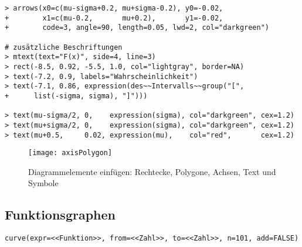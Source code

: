 \begin{lstlisting}
> arrows(x0=c(mu-sigma+0.2, mu+sigma-0.2), y0=-0.02,
+        x1=c(mu-0.2,       mu+0.2),       y1=-0.02,
+        code=3, angle=90, length=0.05, lwd=2, col="darkgreen")

# zusätzliche Beschriftungen
> mtext(text="F(x)", side=4, line=3)
> rect(-8.5, 0.92, -5.5, 1.0, col="lightgray", border=NA)
> text(-7.2, 0.9, labels="Wahrscheinlichkeit")
> text(-7.1, 0.86, expression(des~~Intervalls~~group("[",
+      list(-sigma, sigma), "]")))

> text(mu-sigma/2, 0,    expression(sigma), col="darkgreen", cex=1.2)
> text(mu+sigma/2, 0,    expression(sigma), col="darkgreen", cex=1.2)
> text(mu+0.5,     0.02, expression(mu),    col="red",       cex=1.2)
\end{lstlisting}

\begin{figure}[ht]
\centering
\texttt{[image: axisPolygon]}
\vspace*{-1em}
\caption{Diagrammelemente einfügen: Rechtecke, Polygone, Achsen, Text und Symbole}
\label{fig:axisPolygon}
\end{figure}

\subsection{Funktionsgraphen}

\begin{lstlisting}
curve(expr=<<Funktion>>, from=<<Zahl>>, to=<<Zahl>>, n=101, add=FALSE)
\end{lstlisting}

